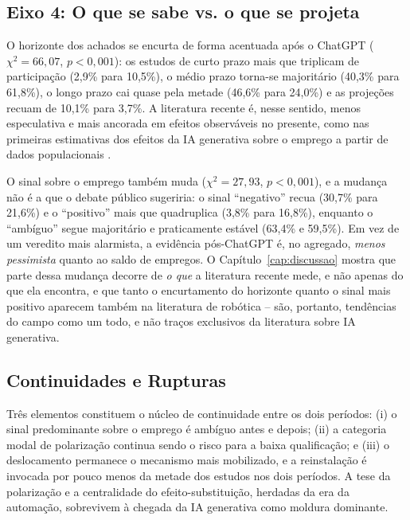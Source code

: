 \begin{table}[htbp]
\centering
\caption{Cobertura e descritivo da magnitude normalizada, pré vs.\ pós-ChatGPT.}
\label{tab:magnitude_cobertura}

\end{table}

\subsection{Eixo 4: O que se sabe vs. o que se projeta}

O horizonte dos achados se encurta de forma acentuada após o ChatGPT ($\chi^2 = 66{,}07$, $p < 0{,}001$): os estudos de curto prazo mais que triplicam de participação (2,9\% para 10,5\%), o médio prazo torna-se majoritário (40,3\% para 61,8\%), o longo prazo cai quase pela metade (46,6\% para 24,0\%) e as projeções recuam de 10,1\% para 3,7\%. A literatura recente é, nesse sentido, menos especulativa e mais ancorada em efeitos observáveis no presente, como nas primeiras estimativas dos efeitos da IA generativa sobre o emprego a partir de dados populacionais \parencite{kauhanenRouvinen2025}.

O sinal sobre o emprego também muda ($\chi^2 = 27{,}93$, $p < 0{,}001$), e a mudança não é a que o debate público sugeriria: o sinal ``negativo'' recua (30,7\% para 21,6\%) e o ``positivo'' mais que quadruplica (3,8\% para 16,8\%), enquanto o ``ambíguo'' segue majoritário e praticamente estável (63,4\% e 59,5\%). Em vez de um veredito mais alarmista, a evidência pós-ChatGPT é, no agregado, \emph{menos pessimista} quanto ao saldo de empregos. O Capítulo~\ref{cap:discussao} mostra que parte dessa mudança decorre de \emph{o que} a literatura recente mede, e não apenas do que ela encontra, e que tanto o encurtamento do horizonte quanto o sinal mais positivo aparecem também na literatura de robótica -- são, portanto, tendências do campo como um todo, e não traços exclusivos da literatura sobre IA generativa.

\subsection{Continuidades e Rupturas}

Três elementos constituem o núcleo de continuidade entre os dois períodos: (i) o sinal predominante sobre o emprego é ambíguo antes e depois; (ii) a categoria  modal de polarização continua sendo o risco para a baixa qualificação; e (iii) o deslocamento permanece o mecanismo mais mobilizado, e a reinstalação é invocada por pouco menos da metade dos estudos nos dois períodos. A tese da polarização e a centralidade do efeito-substituição, herdadas da era da automação, sobrevivem à chegada da IA generativa como moldura dominante.

